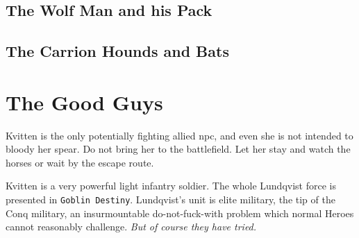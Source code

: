 \subsection*{The Wolf Man and his Pack}
\label{sec:wolfmanstats}







\subsection*{The Carrion Hounds and Bats}
\label{sec:carrionstats}





















\clearpage
{}
\section*{The Good Guys}

Kvitten is the only potentially fighting allied npc, and even she is not intended to bloody her spear. Do not bring her to the battlefield. Let her stay and watch the horses or wait by the escape route.

Kvitten is a very powerful light infantry soldier. The whole Lundqvist force is presented in \texttt{Goblin Destiny}. Lundqvist's unit is elite military, the tip of the Conq military, an insurmountable do-not-fuck-with problem which normal Heroes cannot reasonably challenge. \textit{But of course they have tried.}

